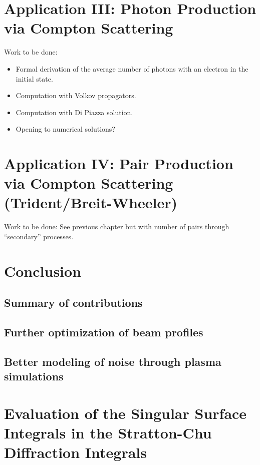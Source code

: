 \documentclass[11pt,SymmetricalJury]{inrsthesis/inrsthesis}
\begin{document}
\chapter{Application III: Photon Production via Compton Scattering}

Work to be done:
  \begin{itemize}
      \item Formal derivation of the average number of photons with an electron
            in the initial state.
      \item Computation with Volkov propagators.
      \item Computation with Di Piazza solution.
      \item Opening to numerical solutions?
\end{itemize}

\chapter{Application IV: Pair Production via Compton Scattering (Trident/Breit-Wheeler)}

Work to be done:
See previous chapter but with number of pairs through ``secondary'' processes.

\chapter{Conclusion}

\section{Summary of contributions}

\section{Further optimization of beam profiles}

\section{Better modeling of noise through plasma simulations}

\appendix
{}
\renewcommand{\thechapter}{\Alph{chapter}}
\renewcommand{\thesection}{\Alph{chapter}.\arabic{section}}
\chapter{Evaluation of the Singular Surface Integrals in the Stratton-Chu Diffraction Integrals}
\label{app.limits}
\end{document}

